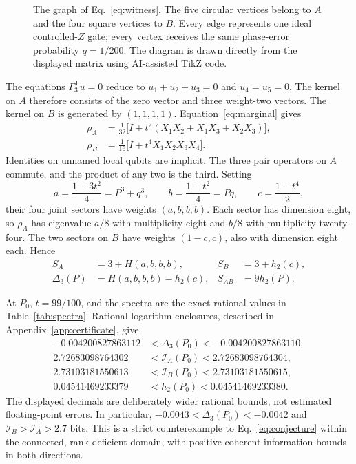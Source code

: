 \documentclass[11pt,a4paper]{article}
\newcommand{\IA}{\mathcal I_A}
\newcommand{\IB}{\mathcal I_B}
\begin{document}
\begin{figure}[tb]
\centering

\caption{The graph of Eq.~\eqref{eq:witness}. The five circular vertices belong
to $A$ and the four square vertices to $B$. Every edge represents one ideal
controlled-$Z$ gate; every vertex receives the same phase-error probability
$q=1/200$. The diagram is drawn directly from the displayed matrix using
AI-assisted TikZ code.}
\label{fig:graph}
\end{figure}

The equations $\Gamma_3^{\mathsf T}u=0$ reduce to
$u_1+u_2+u_3=0$ and $u_4=u_5=0$. The kernel on $A$ therefore consists of
the zero vector and three weight-two vectors. The kernel on $B$ is generated
by $(1,1,1,1)$. Equation~\eqref{eq:marginal} gives
\begin{align}
 \rho_A&=\frac1{32}\bigl[I+t^2(X_1X_2+X_1X_3+X_2X_3)\bigr],\nonumber\\
 \rho_B&=\frac1{16}\bigl[I+t^4X_1X_2X_3X_4\bigr].
 \label{eq:localnine}
\end{align}
Identities on unnamed local qubits are implicit. The three pair operators on
$A$ commute, and the product of any two is the third. Setting
\begin{equation}
 a=\frac{1+3t^2}{4}=P^3+q^3,\qquad
 b=\frac{1-t^2}{4}=Pq,\qquad
 c=\frac{1-t^4}{2},
 \label{eq:abc}
\end{equation}
their four joint sectors have weights $(a,b,b,b)$. Each sector has dimension
eight, so $\rho_A$ has eigenvalue $a/8$ with multiplicity eight and $b/8$
with multiplicity twenty-four. The two sectors on $B$ have weights
$(1-c,c)$, also with dimension eight each. Hence
\begin{align}
 S_A&=3+H(a,b,b,b), & S_B&=3+h_2(c),\nonumber\\
 \Delta_3(P)&=H(a,b,b,b)-h_2(c), & S_{AB}&=9h_2(P).
 \label{eq:nineentropy}
\end{align}

At $P_0$, $t=99/100$, and the spectra are the exact rational values in
Table~\ref{tab:spectra}. Rational logarithm enclosures, described in
Appendix~\ref{app:certificate}, give
\begin{align}
 -0.004200827863112&<\Delta_3(P_0)<-0.004200827863110,\nonumber\\
 2.72683098764302&<\IA(P_0)<2.72683098764304,\nonumber\\
 2.73103181550613&<\IB(P_0)<2.73103181550615,\nonumber\\
 0.04541469233379&<h_2(P_0)<0.04541469233380.
 \label{eq:intervals}
\end{align}
The displayed decimals are deliberately wider rational bounds, not estimated
floating-point errors. In particular,
$-0.0043<\Delta_3(P_0)<-0.0042$ and $\IB>\IA>2.7$ bits.
This is a strict counterexample to Eq.~\eqref{eq:conjecture} within the
connected, rank-deficient domain, with positive coherent-information bounds
in both directions.
\end{document}
